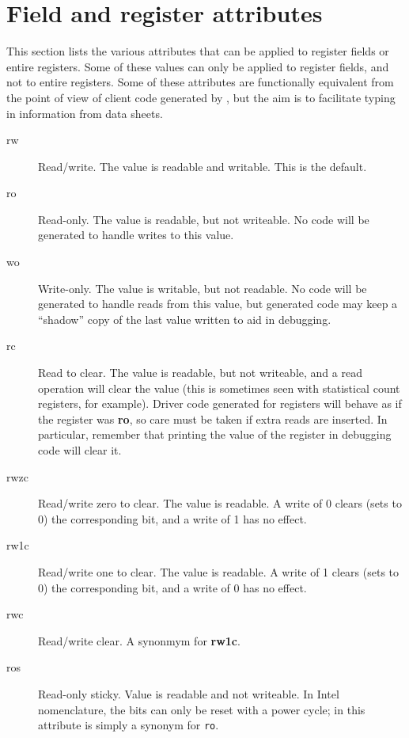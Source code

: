 \documentclass[a4paper,11pt,twoside]{report}
\begin{document}
\section{Field and register attributes}\label{sec:fieldattrs}

This section lists the various attributes that can be applied to
register fields or entire registers.  Some of these values can only be
applied to register fields, and not to entire registers.   Some of
these attributes are functionally equivalent from the point of view of
client code generated by \Mac, but the aim is to facilitate typing in
information from data sheets. 

\begin{description}

\item[rw] Read/write.  The value is readable and writable.  This is
  the default. 

\item[ro] Read-only.  The value is readable, but not writeable.  No
  code will be generated to handle writes to this value. 

\item[wo] Write-only.  The value is writable, but not readable.  No
  code will be generated to handle reads from this value, but
  generated code may keep a ``shadow'' copy of the last value written
  to aid in debugging. 

\item[rc] Read to clear.  The value is readable, but not writeable,
  and a read operation will clear the value (this is sometimes seen
  with statistical count registers, for example).  Driver code
  generated for registers will behave as if the register was
  \textbf{ro}, so care must be taken if extra reads are inserted.  In
  particular, remember that printing the value of the register in
  debugging code will clear it. 

\item[rwzc] Read/write zero to clear. The value is readable. A write of 0
  clears (sets to 0) the corresponding bit, and a write of 1 has no effect.

\item[rw1c] Read/write one to clear.  The value is readable. A write of 1
  clears (sets to 0) the corresponding bit, and a write of 0 has no
  effect. 

\item[rwc] Read/write clear.  A synonmym for \textbf{rw1c}.

\item[ros] Read-only sticky.  Value is readable and not writeable.  In
  Intel nomenclature, the bits can only be reset with a power cycle;
  in \Mac this attribute is simply a synonym for \texttt{ro}. 


\end{description}
\end{document}
